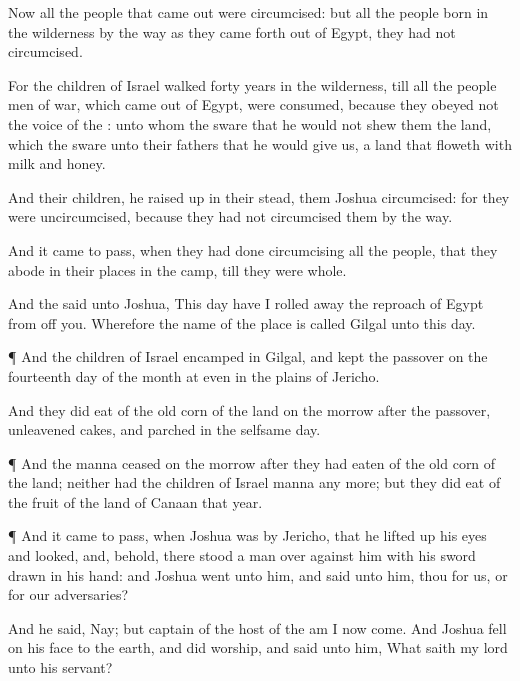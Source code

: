 {Now all the
people that came
out were
circumcised: but all the
people
{}
born in the
wilderness by the
way as they came
forth out of
Egypt,
{} they had not
circumcised.

For the
children of
Israel
walked
forty
years in the
wilderness, till all the
people
{}
men of
war, which came
out of
Egypt, were
consumed, because they
obeyed not the
voice of the
{}: unto whom the
{}
sware that he would not
shew them the
land, which the
{}
sware unto their
fathers that he would
give us, a
land that
floweth with
milk and
honey.

And their
children,
{} he raised
up in their stead, them
Joshua
circumcised: for they were
uncircumcised, because they had not
circumcised them by the
way.

And it came to pass, when they had
done
circumcising all the
people, that they
abode in their places in the
camp, till they were
whole.

And the
{}
said unto
Joshua, This
day have I rolled
away the
reproach of
Egypt from off you. Wherefore the
name of the
place is
called
Gilgal unto this
day.


\par }{\PP {}¶ And the
children of
Israel
encamped in
Gilgal, and
kept the
passover on the
fourteenth
day of the
month at
even in the
plains of
Jericho.

And they did
eat of the old
corn of the
land on the
morrow after the
passover, unleavened
cakes, and
parched
{} in the
selfsame
day.


\par }{\PP {}¶ And the
manna
ceased on the
morrow after they had
eaten of the old
corn of the
land; neither had the
children of
Israel
manna any more; but they did
eat of the
fruit of the
land of
Canaan that
year.


\par }{\PP {}¶ And it came to pass, when
Joshua was by
Jericho, that he lifted
up his
eyes and
looked, and, behold, there
stood a
man over against him with his
sword
drawn in his
hand: and
Joshua
went unto him, and
said unto him,
{} thou for us, or for our
adversaries?

And he
said, Nay; but
{}
captain of the
host of the
{} am I now
come. And
Joshua
fell on his
face to the
earth, and did
worship, and
said unto him, What
saith my
lord unto his
servant?

}
